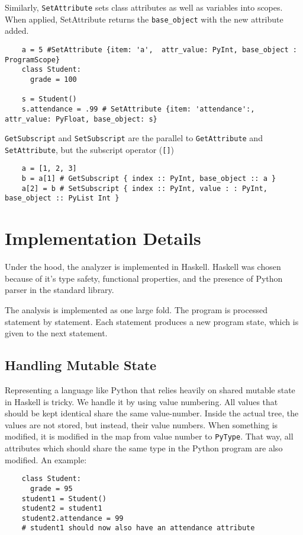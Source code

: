 \documentclass{article}[12pt]
\begin{document}
Similarly, \verb=SetAttribute= sets class attributes as well as variables into scopes. When applied,
SetAttribute returns the \verb=base_object= with the new attribute added.

\begin{verbatim}
    a = 5 #SetAttribute {item: 'a',  attr_value: PyInt, base_object : ProgramScope}
    class Student:
      grade = 100

    s = Student()
    s.attendance = .99 # SetAttribute {item: 'attendance':, attr_value: PyFloat, base_object: s}
\end{verbatim}

\verb=GetSubscript= and \verb=SetSubscript= are the parallel to \verb=GetAttribute= and
\verb=SetAttribute=, but the subscript operator (\verb=[]=)

\begin{verbatim}
    a = [1, 2, 3]
    b = a[1] # GetSubscript { index :: PyInt, base_object :: a }
    a[2] = b # SetSubscript { index :: PyInt, value : : PyInt, base_object :: PyList Int }
\end{verbatim}

\section{Implementation Details}

Under the hood, the analyzer is implemented in Haskell. Haskell was chosen because of it's type
safety, functional properties, and the presence of Python parser in the standard library. 

The analysis is implemented as one large fold. The program is processed statement by statement. Each
statement produces a new program state, which is given to the next statement.

\subsection{Handling Mutable State}
Representing a language like Python that relies heavily on shared mutable state in Haskell is
tricky. We handle it by using value numbering. All values that should be kept identical share the
same value-number. Inside the actual tree, the values are not stored, but instead, their value
numbers. When something is modified, it is modified in the map from value number to \verb=PyType=.
That way, all attributes which should share the same type in the Python program are also modified.
An example:

\begin{verbatim}
    class Student:
      grade = 95
    student1 = Student()
    student2 = student1
    student2.attendance = 99
    # student1 should now also have an attendance attribute
\end{verbatim}
\end{document}
